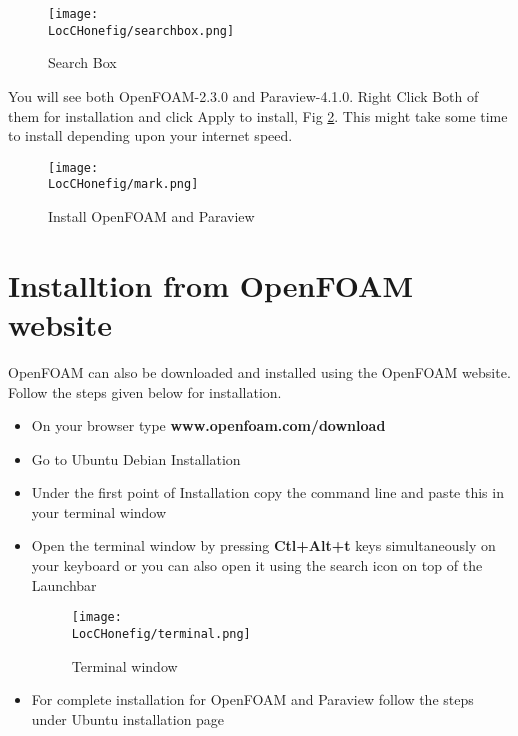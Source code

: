 \begin{figure}[ht]  
\begin{center}  
\texttt{[image: \\LocCHonefig/searchbox.png]}
\caption{Search Box}
\label{searchbox}
\end{center}  
\end{figure}

\flushleft You will see both OpenFOAM-2.3.0 and Paraview-4.1.0. Right Click Both of them for installation and click Apply to install, Fig \ref{searchbox}. 
This might take some time to install depending upon your internet speed.

\begin{figure}[ht]  
\begin{center}  
\texttt{[image: \\LocCHonefig/mark.png]}
\caption{Install OpenFOAM and Paraview}
\label{searchbox}
\end{center}  
\end{figure}

\section{Installtion from OpenFOAM website}

\flushleft OpenFOAM can also be downloaded and installed using the OpenFOAM website. Follow the steps given below for installation. 
\begin{itemize}
\item On your browser type \textbf{www.openfoam.com/download} 
\item Go to Ubuntu Debian Installation
\item Under the first point of Installation copy the command line and paste this in your terminal window
\item Open the terminal window by pressing \textbf{Ctl+Alt+t} keys simultaneously on your keyboard or you can also open it using the 
search icon on top of the Launchbar

\begin{figure}[ht]  
\begin{center}  
\texttt{[image: \\LocCHonefig/terminal.png]}
\caption{Terminal window}
\label{terminal}
\end{center}  
\end{figure}

\item For complete installation for OpenFOAM and Paraview follow the steps under Ubuntu installation page

\end{itemize}

